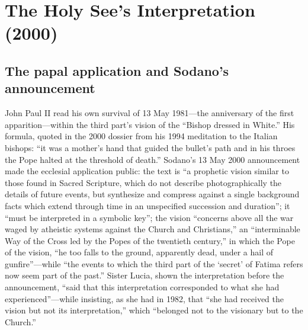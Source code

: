 \section{The Holy See's Interpretation (2000)}\label{sec:interp2000}

\subsection{The papal application and Sodano's announcement}

John Paul II read his own survival of 13 May 1981---the anniversary
of the first apparition---within the third part's vision of the
``Bishop dressed in White.'' His formula, quoted in the 2000 dossier
from his 1994 meditation to the Italian bishops: ``it was a mother's
hand that guided the bullet's path and in his throes the Pope halted
at the threshold of death.'' Sodano's 13 May 2000 announcement made
the ecclesial application public: the text is ``a prophetic vision
similar to those found in Sacred Scripture, which do not describe
photographically the details of future events, but synthesize and
compress against a single background facts which extend through time
in an unspecified succession and duration''; it ``must be interpreted
in a symbolic key''; the vision ``concerns above all the war waged by
atheistic systems against the Church and Christians,'' an
``interminable Way of the Cross led by the Popes of the twentieth
century,'' in which the Pope of the vision, ``he too falls to the
ground, apparently dead, under a hail of gunfire''---while ``the
events to which the third part of the `secret' of Fatima refers now
seem part of the past.'' Sister Lucia, shown the interpretation before the
announcement, ``said that this interpretation corresponded to what
she had experienced''---while insisting, as she had in 1982, that
``she had received the vision but not its interpretation,'' which
``belonged not to the visionary but to the Church.''

